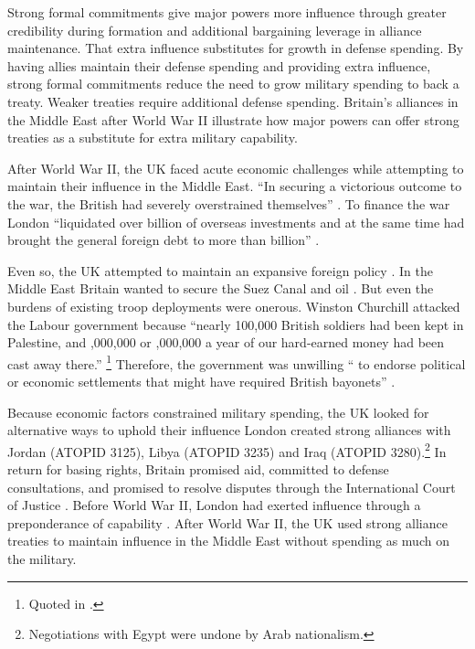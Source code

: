 \documentclass[12pt]{article}
\begin{document}
Strong formal commitments give major powers more influence through greater credibility during formation and additional bargaining leverage in alliance maintenance. 
That extra influence substitutes for growth in defense spending. 
By having allies maintain their defense spending and providing extra influence, strong formal commitments reduce the need to grow military spending to back a treaty.
Weaker treaties require additional defense spending.  
Britain's alliances in the Middle East after World War II illustrate how major powers can offer strong treaties as a substitute for extra military capability. 


After World War II, the UK faced acute economic challenges while attempting to maintain their influence in the Middle East. 
``In securing a victorious outcome to the war, the British had severely overstrained themselves'' \citep[pg. 367]{Kennedy1987}. 
To finance the war London ``liquidated over  billion of overseas investments and at the same time had brought the general foreign debt to more than  billion'' \citep[pg. 12]{Louis1984}.
 

Even so, the UK attempted to maintain an expansive foreign policy \citep{Mayhew1950}. 
In the Middle East Britain wanted to secure the Suez Canal and oil \citep{Rahman1982}. 
But even the burdens of existing troop deployments were onerous. 
Winston Churchill attacked the Labour government because ``nearly 100,000 British soldiers had been kept in Palestine, and ,000,000 or ,000,000 a year of our hard-earned money had been cast away there.''
\footnote{Quoted in \citet[pg. 11]{Louis1984}.}
Therefore, the government was unwilling `` to endorse political or economic settlements that might have required British bayonets'' \citep[pg. 15]{Louis1984}. 


Because economic factors constrained military spending, the UK looked for alternative ways to uphold their influence \citep{Monroe1963, Louis1984}
London created strong alliances with Jordan (ATOPID 3125), Libya (ATOPID 3235) and Iraq (ATOPID 3280).\footnote{Negotiations with Egypt were undone by Arab nationalism.} 
In return for basing rights, Britain promised aid, committed to defense consultations, and promised to resolve disputes through the International Court of Justice \citep{Leedsetal2002}. 
Before World War II, London had exerted influence through a preponderance of capability \citep{Monroe1963}.
After World War II, the UK used strong alliance treaties to maintain influence in the Middle East without spending as much on the military. 
\end{document}
